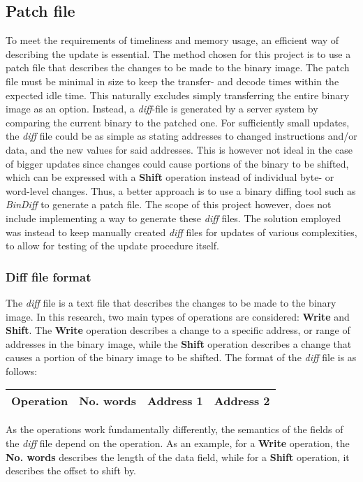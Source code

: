 
\subsection{Patch file}\label{sec:patchfile}
To meet the requirements of timeliness and memory usage, an efficient way of describing the update is essential. The method chosen for this project is to use a patch file that describes the changes to be made to the binary image.
The patch file must be minimal in size to keep the transfer- and decode times within the expected idle time. This naturally excludes simply transferring the entire binary image as an option. Instead, a \textit{\textit{diff}}-file is generated by a server system by comparing the current binary to the patched one. For sufficiently small updates, the \textit{diff} file could be as simple as stating addresses to changed instructions and/or data, and the new values for said addresses. This is however not ideal in the case of bigger updates since changes could cause portions of the binary to be shifted, which can be expressed with a \textbf{Shift} operation instead of individual byte- or word-level changes. Thus, a better approach is to use a binary diffing tool such as \textit{BinDiff} to generate a patch file. The scope of this project however, does not include implementing a way to generate these \textit{diff} files. The solution employed was instead to keep manually created \textit{diff} files for updates of various complexities, to allow for testing of the update procedure itself. 

\subsubsection*{Diff file format}
The \textit{diff} file is a text file that describes the changes to be made to the binary image. In this research, two main types of operations are considered: \textbf{Write} and \textbf{Shift}. The \textbf{Write} operation describes a change to a specific address, or range of addresses in the binary image, while the \textbf{Shift} operation describes a change that causes a portion of the binary image to be shifted. The format of the \textit{diff} file is as follows:

\begin{center}
\begin{tabular}{|c|c|c|c|}
\hline
\textbf{Operation} & \textbf{No. words} & \textbf{Address 1}  & \textbf{Address 2} \\
\hline
\end{tabular}
\end{center}
As the operations work fundamentally differently, the semantics of the fields of the \textit{diff} file depend on the operation. As an example, for a \textbf{Write} operation, the \textbf{No. words} describes the length of the data field, while for a \textbf{Shift} operation, it describes the offset to shift by.
